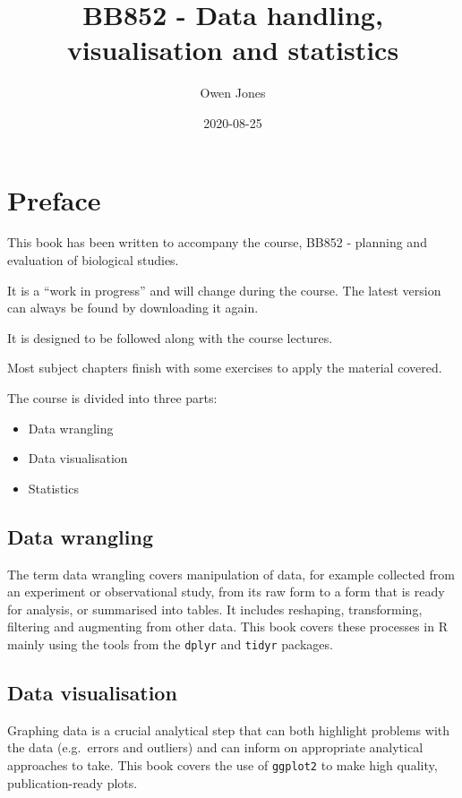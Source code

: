 \documentclass[
  a4paperpaper,
]{book}
\title{BB852 - Data handling, visualisation and statistics}
\author{Owen Jones}
\date{2020-08-25}
\providecommand{\tightlist}{%
  \setlength{\itemsep}{0pt}\setlength{\parskip}{0pt}}
\begin{document}
\maketitle

{
\setcounter{tocdepth}{1}
\tableofcontents
}
\hypertarget{preface}{%
\chapter{Preface}\label{preface}}

This book has been written to accompany the course, BB852 - planning and evaluation of biological studies.

It is a ``work in progress'' and will change during the course. The latest version can always be found by downloading it again.

It is designed to be followed along with the course lectures.

Most subject chapters finish with some exercises to apply the material covered.

The course is divided into three parts:

\begin{itemize}
\tightlist
\item
  Data wrangling
\item
  Data visualisation
\item
  Statistics
\end{itemize}

\hypertarget{data-wrangling}{%
\section{Data wrangling}\label{data-wrangling}}

The term data wrangling covers manipulation of data, for example collected from an experiment or observational study, from its raw form to a form that is ready for analysis, or summarised into tables. It includes reshaping, transforming, filtering and augmenting from other data. This book covers these processes in R mainly using the tools from the \texttt{dplyr} and \texttt{tidyr} packages.

\hypertarget{data-visualisation}{%
\section{Data visualisation}\label{data-visualisation}}

Graphing data is a crucial analytical step that can both highlight problems with the data (e.g.~errors and outliers) and can inform on appropriate analytical approaches to take. This book covers the use of \texttt{ggplot2} to make high quality, publication-ready plots.
\end{document}
